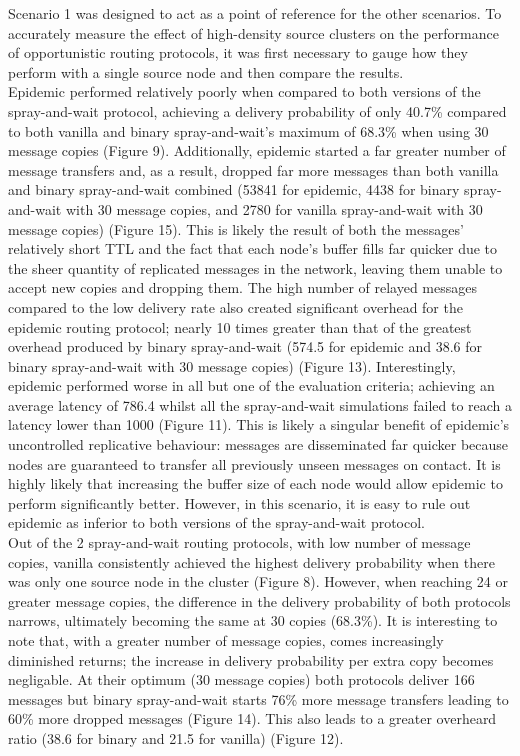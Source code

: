 \documentclass{article}
\begin{document}
\newpage

\noindent Scenario 1 was designed to act as a point of reference for the other scenarios. To accurately measure the effect of high-density source clusters on the performance of opportunistic routing protocols, it was first necessary to gauge how they perform with a single source node and then compare the results.\\
\newline Epidemic performed relatively poorly when compared to both versions of the spray-and-wait protocol, achieving a delivery probability of only 40.7\% compared to both vanilla and binary spray-and-wait's maximum of 68.3\% when using 30 message copies (Figure 9). Additionally, epidemic started a far greater number of message transfers and, as a result, dropped far more messages than both vanilla and binary spray-and-wait combined (53841 for epidemic, 4438 for binary spray-and-wait with 30 message copies, and 2780 for vanilla spray-and-wait with 30 message copies) (Figure 15). This is likely the result of both the messages' relatively short TTL and the fact that each node's buffer fills far quicker due to the sheer quantity of replicated messages in the network, leaving them unable to accept new copies and dropping them. The high number of relayed messages compared to the low delivery rate also created significant overhead for the epidemic routing protocol; nearly 10 times greater than that of the greatest overhead produced by binary spray-and-wait (574.5 for epidemic and 38.6 for binary spray-and-wait with 30 message copies) (Figure 13). Interestingly, epidemic performed worse in all but one of the evaluation criteria; achieving an average latency of 786.4 whilst all the spray-and-wait simulations failed to reach a latency lower than 1000 (Figure 11). This is likely a singular benefit of epidemic's uncontrolled replicative behaviour: messages are disseminated far quicker because nodes are guaranteed to transfer all previously unseen messages on contact. It is highly likely that increasing the buffer size of each node would allow epidemic to perform significantly better. However, in this scenario, it is easy to rule out epidemic as inferior to both versions of the spray-and-wait protocol.\\
\newline Out of the 2 spray-and-wait routing protocols, with low number of message copies, vanilla consistently achieved the highest delivery probability when there was only one source node in the cluster (Figure 8). However, when reaching 24 or greater message copies, the difference in the delivery probability of both protocols narrows, ultimately becoming the same at 30 copies (68.3\%). It is interesting to note that, with a greater number of message copies, comes increasingly diminished returns; the increase in delivery probability per extra copy becomes negligable. At their optimum (30 message copies) both protocols deliver 166 messages but binary spray-and-wait starts 76\% more message transfers leading to 60\% more dropped messages (Figure 14). This also leads to a greater overheard ratio (38.6 for binary and 21.5 for vanilla) (Figure 12).\\
\end{document}
